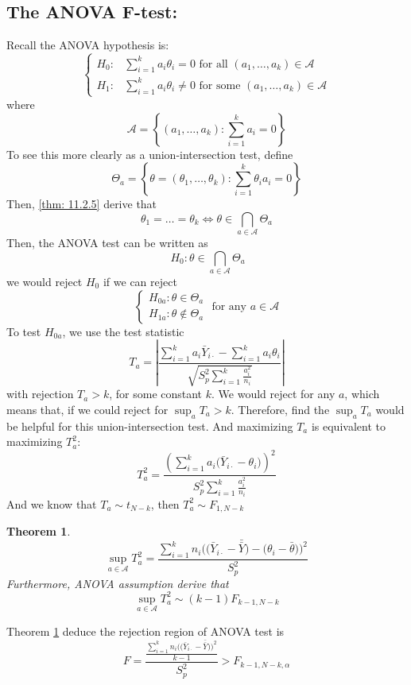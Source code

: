 \documentclass[11pt]{article}
\newtheorem{thm}{Theorem}[subsection]
\begin{document}
\subsection{The ANOVA F-test: }
Recall the ANOVA hypothesis is:
$$\begin{cases}
	H_0: & \sum_{i = 1}^k a_i \theta_i = 0 \text{ for all } (a_1, \dots, a_k) \in \mathcal{A} \\
	H_1: & \sum_{i = 1}^k a_ i \theta_i \neq 0 \text{ for some }  (a_1, \dots, a_k) \in \mathcal{A}
\end{cases} $$
where $$\mathcal{A} = \left\{(a_1, \dots, a_k): \sum_{i = 1}^k a_i = 0\right\} $$
To see this more clearly as a union-intersection test, define
$$\Theta_a = \left\{ \theta = (\theta_1, \dots, \theta_k): \sum_{ i = 1}^k \theta_i a_i = 0
\right\} $$
Then, \ref{thm: 11.2.5} derive that
$$\theta_1 = \dots = \theta_k \Leftrightarrow \theta \in \bigcap_{a \in \mathcal{A}} \Theta_a $$
Then, the ANOVA test can be written as
$$\
	H_0: \theta \in \bigcap_{a \in \mathcal{A}} \Theta_a 
$$ we would reject $H_0$ if we can reject 
$$\begin{cases}
	H_{0a}: \theta \in \Theta_a \\
	H_{1a}: \theta \notin \Theta_a 
\end{cases} \text{ for any } a \in \mathcal{A}$$
To test $H_{0a}$, we use the test statistic 
$$T_a =  \left| \dfrac{\sum_{ i = 1}^k a_i \bar{Y}_{i \cdot} - \sum_{i = 1}^k a_i \theta_i}{\sqrt{S_p^2 \sum_{ i = 1}^k \frac{a_i^2}{n_i}}}   \right|$$ with rejection $T_a > k$, for some constant $k$.  We would reject for any $a$, which means that, if we could reject for $\sup_{a}T_a > k$. Therefore, find the $\sup_{a} T_a$ would be helpful for this union-intersection test.  And maximizing $T_a$ is equivalent to maximizing $T_a^2$:
$$T_a^2 = \dfrac{\left(\sum_{i = 1}^k a_i\big(\bar{Y}_{i\cdot}  - \theta_i \big)\right)^2}{S_p^2 \sum_{i = 1}^k \frac{a_i^2}{n_i}} $$
And we know that $T_a \sim t_{N - k}$, then $T_a^2 \sim F_{1, N- k}$
\begin{thm} \label{thm:  F_stat}
	$$\sup_{a \in \mathcal{A}} T_a^2 = \dfrac{\sum_{i = 1}^k n_i \bigg( \big(\bar{Y}_{i \cdot} - \bar{\bar{Y}}\big) - \big(\theta_i - \bar{\theta }\big) \bigg)^2}{S_p^2} $$
	Furthermore, ANOVA assumption derive that $$\sup_{a \in\mathcal{A}} T_a^2 \sim (k - 1) F_{k - 1, N- k}  $$
\end{thm}
Theorem \ref{thm:  F_stat} deduce  the rejection region of ANOVA test is 
$$ F =  \dfrac{\frac{\sum_{i = 1}^k n_i \bigg( \big(\bar{Y}_{i \cdot} - \bar{\bar{Y}}\big) \bigg)^2}{k - 1}}{S_p^2} > F_{k-1, N-k, \alpha}$$ 
\end{document}
